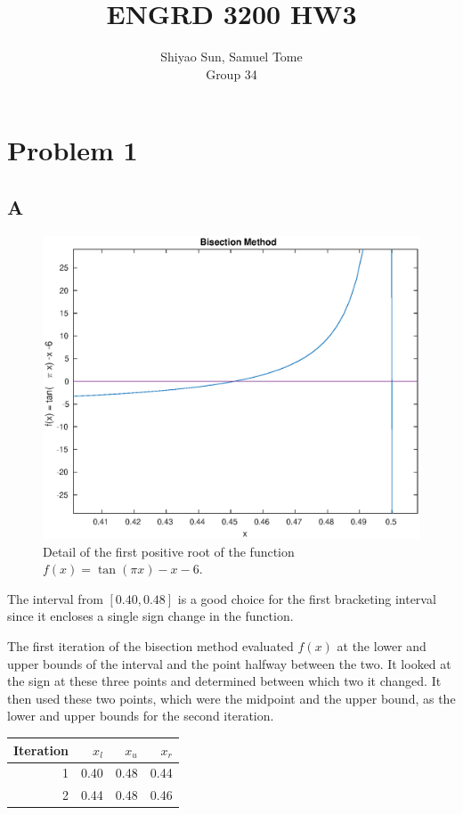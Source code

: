 \documentclass{article}
\title{\huge ENGRD 3200 HW3}
\author{\small Shiyao Sun, Samuel Tome \\ Group 34}
\begin{document}
\maketitle
\captionsetup{width=1 \linewidth}

\section*{Problem 1}
\subsection*{A}


\begin{figure}[H]
\centering
\includegraphics[width=5in]{Problem1.eps}
\caption{Detail of the first positive root of the function $f(x) = \tan(\pi x) -x -6 $.}
\end{figure}

The interval from $ [0.40,0.48]$ is a good choice for the first bracketing interval since it encloses a single sign change in the function.

The first iteration of the bisection method evaluated $f(x)$ at the lower and upper bounds of the interval and the point halfway between the two.  It looked at the sign at these three points and determined between which two it changed.  It then used these two points, which were the midpoint and the upper bound, as the lower and upper bounds for the second iteration.

\begin{table}[H]
\centering
\begin{tabular} { r  r  r r }
Iteration &  $x_l$  &  $x_u$  &  $x_r$   \\ \hline 
1 & 0.40 & 0.48 & 0.44 \\
2 & 0.44 & 0.48 & 0.46 
\end{tabular}
\end{table}
\end{document}
